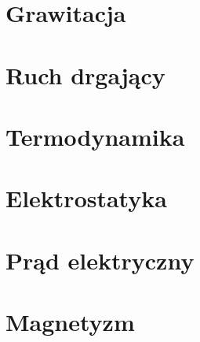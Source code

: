 \documentclass{article}
\numberwithin{equation}{section}
\begin{document}
  \newpage
  \section{Grawitacja}

  \newpage
  \section{Ruch drgający}

  \newpage
  \section{Termodynamika}

  \newpage
  \section{Elektrostatyka}

  \newpage
  \section{Prąd elektryczny}

  \newpage
  \section{Magnetyzm}
\end{document}
